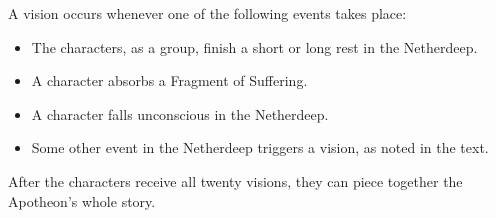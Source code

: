 \documentclass[10pt,a4paper,twoside,twocolumn,openany,nodeprecatedcode]{dndbook}
\begin{document}
A vision occurs whenever one of the following events takes place:


\begin{itemize}
\item The characters, as a group, finish a short or long rest in the Netherdeep.
\item A character absorbs a Fragment of Suffering.
\item A character falls unconscious in the Netherdeep.
\item Some other event in the Netherdeep triggers a vision, as noted in the text.
\end{itemize}

After the characters receive all twenty visions, they can piece together the Apotheon's whole story.

{
  \par \vspace { 9pt plus 3pt minus 3pt } \noindent
   \nopagebreak
}
\end{document}
